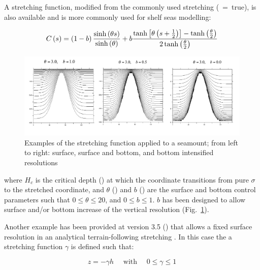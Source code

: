 {A stretching function, modified from the commonly used \citet{Song_Haidvogel_JCP94} stretching (~=~true), is also available and is more commonly used for shelf seas modelling:

\begin{equation}
  C\left(s\right) =   \left(1 - b \right)\frac{ \sinh\left( \theta s\right)}{\sinh\left(\theta\right)} +      \\
  b\frac{ \tanh \left[ \theta \left(s + \frac{1}{2} \right)\right] - \tanh\left(\frac{\theta}{2}\right)}{ 2\tanh\left (\frac{\theta}{2}\right)}
  \label{eq:SH94_2}
\end{equation}

\begin{figure}[!ht]    \begin{center}
\includegraphics[width=1.0\textwidth]{./TexFiles/Figures/Fig_sco_function.pdf}
\caption{  \label{Fig_sco_function}   
Examples of the stretching function applied to a seamount; from left to right: 
surface, surface and bottom, and bottom intensified resolutions}
\end{center}   \end{figure}

where $H_c$ is the critical depth () at which the coordinate transitions from pure $\sigma$ to the stretched coordinate,  and $\theta$ () and $b$ () are the surface and 
bottom control parameters such that $0\leqslant \theta \leqslant 20$, and 
$0\leqslant b\leqslant 1$. $b$ has been designed to allow surface and/or bottom 
increase of the vertical resolution (Fig.~\ref{Fig_sco_function}).

Another example has been provided at version 3.5 () that allows a fixed surface resolution in an analytical terrain-following stretching \citet{Siddorn_Furner_OM12}. In this case the a stretching function $\gamma$ is defined such that:

\begin{equation}
z = -\gamma h \quad \text{ with } \quad 0 \leq \gamma \leq 1
\label{eq:z}
\end{equation}

}
